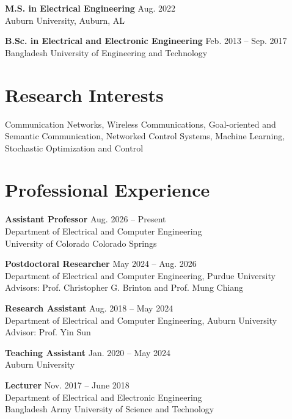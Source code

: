 \documentclass[letterpaper,11pt]{article}
\newcommand{\resumeSubHeadingListStart}{\begin{itemize}[leftmargin=0.0in, label={}]}
\begin{document}
\textbf{M.S. in Electrical Engineering} \hfill Aug. 2022 \\
{Auburn University, Auburn, AL}
\medskip

\textbf{B.Sc. in Electrical and Electronic Engineering} \hfill Feb. 2013 -- Sep. 2017 \\
{Bangladesh University of Engineering and Technology}


\section{Research Interests}
        Communication Networks, Wireless Communications, Goal-oriented and Semantic Communication, Networked Control Systems, Machine Learning, Stochastic Optimization and Control
        
\vspace{0pt}
\section*{Professional Experience}
\textbf{Assistant Professor} \hfill Aug. 2026 -- Present \\
Department of Electrical and Computer Engineering \\
University of Colorado Colorado Springs\\
\medskip

\textbf{Postdoctoral Researcher} \hfill May 2024 -- Aug. 2026 \\
Department of Electrical and Computer Engineering, Purdue University  \\
Advisors: Prof. Christopher G. Brinton and Prof. Mung Chiang 
\medskip

\textbf{Research Assistant} \hfill Aug. 2018 -- May 2024 \\
Department of Electrical and Computer Engineering, Auburn University  \\ Advisor: Prof. Yin Sun
\medskip

\textbf{Teaching Assistant} \hfill Jan. 2020 -- May 2024 \\ Auburn University 
\medskip

\textbf{Lecturer} \hfill Nov. 2017 -- June 2018 \\
Department of Electrical and Electronic Engineering\\ Bangladesh Army University of Science and Technology 

\end{document}
